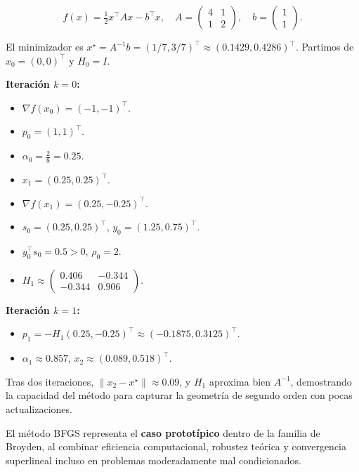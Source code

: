 \documentclass[
  spanish,
  us-letterpaper,
]{scrreprt}
\providecommand{\tightlist}{%
  \setlength{\itemsep}{0pt}\setlength{\parskip}{0pt}}
\numberwithin{equation}{section}
\begin{document}
\[
f(x) = \tfrac{1}{2} x^\top A x - b^\top x, \quad
A = \begin{pmatrix} 4 & 1 \\ 1 & 2 \end{pmatrix}, \quad
b = \begin{pmatrix} 1 \\ 1 \end{pmatrix}.
\]

El minimizador es
\(x^\star = A^{-1}b = (1/7, 3/7)^\top \approx (0.1429, 0.4286)^\top\).
Partimos de \(x_0 = (0,0)^\top\) y \(H_0 = I\).

\textbf{Iteración \(k = 0\):}

\begin{itemize}
\tightlist
\item
  \(\nabla f(x_0) = (-1, -1)^\top\).
\item
  \(p_0 = (1,1)^\top\).
\item
  \(\alpha_0 = \frac{2}{8} = 0.25\).
\item
  \(x_1 = (0.25, 0.25)^\top\).
\item
  \(\nabla f(x_1) = (0.25, -0.25)^\top\).
\item
  \(s_0 = (0.25, 0.25)^\top\), \(y_0 = (1.25, 0.75)^\top\).
\item
  \(y_0^\top s_0 = 0.5 > 0\), \(\rho_0 = 2\).
\item
  \(H_1 \approx \begin{pmatrix} 0.406 & -0.344 \\ -0.344 & 0.906 \end{pmatrix}\).
\end{itemize}

\textbf{Iteración \(k = 1\):}

\begin{itemize}
\tightlist
\item
  \(p_1 = -H_1 (0.25, -0.25)^\top \approx (-0.1875, 0.3125)^\top\).
\item
  \(\alpha_1 \approx 0.857\), \(x_2 \approx (0.089, 0.518)^\top\).
\end{itemize}

Tras dos iteraciones, \(\|x_2 - x^\star\| \approx 0.09\), y \(H_1\)
aproxima bien \(A^{-1}\), demostrando la capacidad del método para
capturar la geometría de segundo orden con pocas actualizaciones.

El método BFGS representa el \textbf{caso prototípico} dentro de la
familia de Broyden, al combinar eficiencia computacional, robustez
teórica y convergencia superlineal incluso en problemas moderadamente
mal condicionados.
\end{document}
